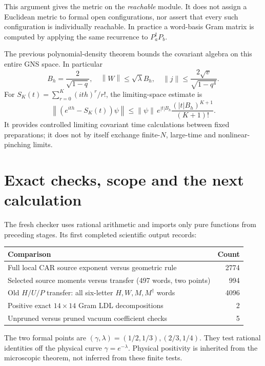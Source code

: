 \documentclass[11pt]{article}
\newcommand{\norm}[1]{\left\lVert#1\right\rVert}
\begin{document}
This argument gives the metric on the \emph{reachable} module. It does
not assign a Euclidean metric to formal open configurations, nor assert
that every such configuration is individually reachable. In practice a
word-basis Gram matrix is computed by applying the same recurrence to
$P_a^\dagger P_b$.

The previous polynomial-density theorem bounds the covariant algebra
on this entire GNS space. In particular
\begin{equation}
 B_h=\frac2{\sqrt{1-q}},\quad
 \norm W\le\sqrt\lambda B_h,\quad
 \norm j\le\frac{2\sqrt v}{\sqrt{1-q^4}}.
\end{equation}
For $S_K(t)=\sum_{r=0}^K(ith)^r/r!$, the limiting-space estimate is
\begin{equation}
 \norm{(e^{ith}-S_K(t))\psi}
 \le\norm\psi\,e^{|t|B_h}
              \frac{(|t|B_h)^{K+1}}{(K+1)!}.
\end{equation}
It provides controlled limiting covariant time calculations between
fixed preparations; it does not by itself exchange finite-$N$,
large-time and nonlinear-pinching limits.

\newpage
\section{Exact checks, scope and the next calculation}
The fresh checker uses rational arithmetic and imports only pure
functions from preceding stages. Its first completed scientific output
records:
\begin{center}
\begin{tabular}{lr}\toprule
Comparison&Count\\\midrule
Full local CAR source exponent versus geometric rule&2774\\
Selected source moments versus transfer (497 words, two points)&994\\
Old $H/U/P$ transfer: all six-letter $H,W,M,M^\dagger$ words&4096\\
Positive exact $14\times14$ Gram LDL decompositions&2\\
Unpruned versus pruned vacuum coefficient checks&5\\\bottomrule
\end{tabular}
\end{center}
The two formal points are $(\gamma,\lambda)=(1/2,1/3),(2/3,1/4)$.
They test rational identities off the physical curve
$\gamma=e^{-\lambda}$. Physical positivity is inherited from the
microscopic theorem, not inferred from these finite tests.
\end{document}
